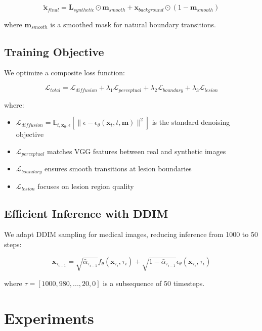\documentclass[10pt,twocolumn]{article}
\begin{document}
\begin{equation}
\tilde{\mathbf{x}}_{final} = \mathbf{L}_{synthetic} \odot \mathbf{m}_{smooth} + \mathbf{x}_{background} \odot (1 - \mathbf{m}_{smooth})
\end{equation}

where $\mathbf{m}_{smooth}$ is a smoothed mask for natural boundary transitions.

\subsection{Training Objective}

We optimize a composite loss function:

\begin{equation}
\mathcal{L}_{total} = \mathcal{L}_{diffusion} + \lambda_1 \mathcal{L}_{perceptual} + \lambda_2 \mathcal{L}_{boundary} + \lambda_3 \mathcal{L}_{lesion}
\end{equation}

where:
\begin{itemize}
\item $\mathcal{L}_{diffusion} = \mathbb{E}_{t,\mathbf{x}_0,\epsilon}[\|\epsilon - \epsilon_\theta(\mathbf{x}_t, t, \mathbf{m})\|^2]$ is the standard denoising objective
\item $\mathcal{L}_{perceptual}$ matches VGG features between real and synthetic images
\item $\mathcal{L}_{boundary}$ ensures smooth transitions at lesion boundaries
\item $\mathcal{L}_{lesion}$ focuses on lesion region quality
\end{itemize}

\subsection{Efficient Inference with DDIM}

We adapt DDIM sampling for medical images, reducing inference from 1000 to 50 steps:

\begin{equation}
\mathbf{x}_{\tau_{i-1}} = \sqrt{\bar{\alpha}_{\tau_{i-1}}} f_\theta(\mathbf{x}_{\tau_i}, \tau_i) + \sqrt{1-\bar{\alpha}_{\tau_{i-1}}} \epsilon_\theta(\mathbf{x}_{\tau_i}, \tau_i)
\end{equation}

where $\tau = [1000, 980, ..., 20, 0]$ is a subsequence of 50 timesteps.

\section{Experiments}
\end{document}
